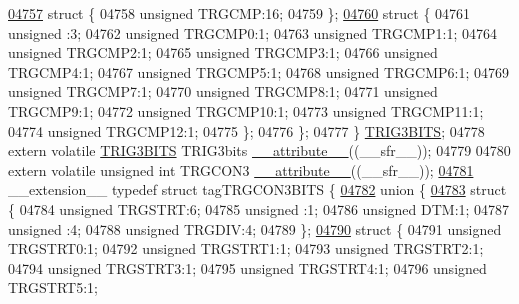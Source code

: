 \begin{DoxyCode}
\hypertarget{a00015_source_l04757}{}\hyperlink{a00015}{04757}     \textcolor{keyword}{struct }\{
04758       \textcolor{keywordtype}{unsigned} TRGCMP:16;
04759     \};
\hypertarget{a00015_source_l04760}{}\hyperlink{a00015}{04760}     \textcolor{keyword}{struct }\{
04761       \textcolor{keywordtype}{unsigned} :3;
04762       \textcolor{keywordtype}{unsigned} TRGCMP0:1;
04763       \textcolor{keywordtype}{unsigned} TRGCMP1:1;
04764       \textcolor{keywordtype}{unsigned} TRGCMP2:1;
04765       \textcolor{keywordtype}{unsigned} TRGCMP3:1;
04766       \textcolor{keywordtype}{unsigned} TRGCMP4:1;
04767       \textcolor{keywordtype}{unsigned} TRGCMP5:1;
04768       \textcolor{keywordtype}{unsigned} TRGCMP6:1;
04769       \textcolor{keywordtype}{unsigned} TRGCMP7:1;
04770       \textcolor{keywordtype}{unsigned} TRGCMP8:1;
04771       \textcolor{keywordtype}{unsigned} TRGCMP9:1;
04772       \textcolor{keywordtype}{unsigned} TRGCMP10:1;
04773       \textcolor{keywordtype}{unsigned} TRGCMP11:1;
04774       \textcolor{keywordtype}{unsigned} TRGCMP12:1;
04775     \};
04776   \};
04777 \} \hyperlink{a00014_dd/d5f/a00825}{TRIG3BITS};
04778 \textcolor{keyword}{extern} \textcolor{keyword}{volatile} \hyperlink{a00014_dd/d5f/a00825}{TRIG3BITS} TRIG3bits \hyperlink{a00015_a493c46f03454991ccc5aa7a6e1dfb2a7}{\_\_attribute\_\_}((\_\_sfr\_\_));
04779 
04780 \textcolor{keyword}{extern} \textcolor{keyword}{volatile} \textcolor{keywordtype}{unsigned} \textcolor{keywordtype}{int}  TRGCON3 \hyperlink{a00015_a493c46f03454991ccc5aa7a6e1dfb2a7}{\_\_attribute\_\_}((\_\_sfr\_\_));
\hypertarget{a00015_source_l04781}{}\hyperlink{a00014}{04781} \_\_extension\_\_ \textcolor{keyword}{typedef} \textcolor{keyword}{struct }tagTRGCON3BITS \{
\hypertarget{a00015_source_l04782}{}\hyperlink{a00015}{04782}   \textcolor{keyword}{union }\{
\hypertarget{a00015_source_l04783}{}\hyperlink{a00015}{04783}     \textcolor{keyword}{struct }\{
04784       \textcolor{keywordtype}{unsigned} TRGSTRT:6;
04785       \textcolor{keywordtype}{unsigned} :1;
04786       \textcolor{keywordtype}{unsigned} DTM:1;
04787       \textcolor{keywordtype}{unsigned} :4;
04788       \textcolor{keywordtype}{unsigned} TRGDIV:4;
04789     \};
\hypertarget{a00015_source_l04790}{}\hyperlink{a00015}{04790}     \textcolor{keyword}{struct }\{
04791       \textcolor{keywordtype}{unsigned} TRGSTRT0:1;
04792       \textcolor{keywordtype}{unsigned} TRGSTRT1:1;
04793       \textcolor{keywordtype}{unsigned} TRGSTRT2:1;
04794       \textcolor{keywordtype}{unsigned} TRGSTRT3:1;
04795       \textcolor{keywordtype}{unsigned} TRGSTRT4:1;
04796       \textcolor{keywordtype}{unsigned} TRGSTRT5:1;

\end{DoxyCode}
